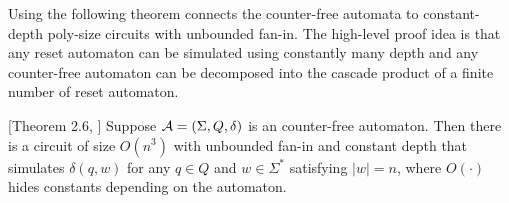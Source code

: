 Using  the following theorem connects the counter-free automata to constant-depth poly-size circuits with unbounded fan-in. The high-level proof idea is that any reset automaton can be simulated using constantly many depth and any counter-free automaton can be decomposed into the cascade product of a finite number of reset automaton. 

\begin{theorem}\label{thm:counter_free_in_AC0}[Theorem 2.6, \citet{chandra1983unbounded}]
	Suppose ${\mathcal{A}}=(\Sigma,Q,\delta)$ is an counter-free automaton. Then there is a circuit of size $O(n^3)$ with unbounded fan-in 
and constant depth that simulates $\delta(q,w)$ for any $q\in Q$ and $w\in\Sigma^*$ satisfying $|w|=n$, where $O(\cdot)$ hides constants depending on the automaton. 
\end{theorem}
